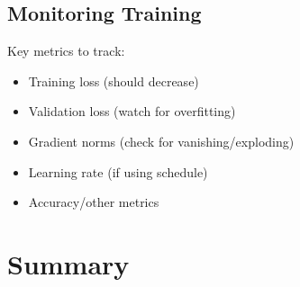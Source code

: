 \documentclass{article}
\begin{document}
\subsection{Monitoring Training}

Key metrics to track:
\begin{itemize}
\item Training loss (should decrease)
\item Validation loss (watch for overfitting)
\item Gradient norms (check for vanishing/exploding)
\item Learning rate (if using schedule)
\item Accuracy/other metrics
\end{itemize}

\section{Summary}
\end{document}
